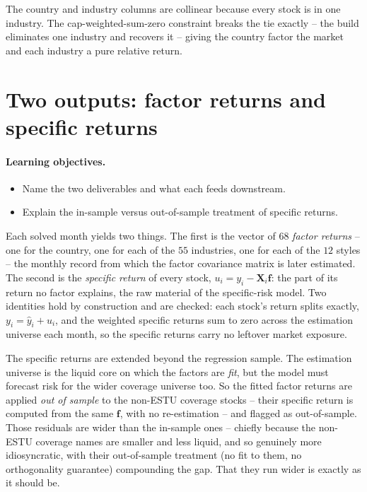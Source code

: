 \documentclass[11pt]{article}
\theoremstyle{definition}
\theoremstyle{plain}
\theoremstyle{remark}
\newcommand{\Xmat}{\mathbf{X}}
\newcommand{\fvec}{\mathbf{f}}
\begin{document}
\begin{keyresult}
The country and industry columns are collinear because every stock is in one industry. The cap-weighted-sum-zero constraint breaks the tie exactly -- the build eliminates one industry and recovers it -- giving the country factor the market and each industry a pure relative return.
\end{keyresult}

\section{Two outputs: factor returns and specific returns}\label{sec:outputs}

\paragraph{Learning objectives.}
\begin{itemize}[leftmargin=1.4em,topsep=2pt]
  \item Name the two deliverables and what each feeds downstream.
  \item Explain the in-sample versus out-of-sample treatment of specific returns.
\end{itemize}

Each solved month yields two things. The first is the vector of $68$ \emph{factor returns} -- one for the country, one for each of the $55$ industries, one for each of the $12$ styles -- the monthly record from which the factor covariance matrix is later estimated. The second is the \emph{specific return} of every stock, $u_i = y_i - \Xmat_i\fvec$: the part of its return no factor explains, the raw material of the specific-risk model. Two identities hold by construction and are checked: each stock's return splits exactly, $y_i = \hat y_i + u_i$, and the weighted specific returns sum to zero across the estimation universe each month, so the specific returns carry no leftover market exposure.

The specific returns are extended beyond the regression sample. The estimation universe is the liquid core on which the factors are \emph{fit}, but the model must forecast risk for the wider coverage universe too. So the fitted factor returns are applied \emph{out of sample} to the non-ESTU coverage stocks -- their specific return is computed from the same $\fvec$, with no re-estimation -- and flagged as out-of-sample. Those residuals are wider than the in-sample ones -- chiefly because the non-ESTU coverage names are smaller and less liquid, and so genuinely more idiosyncratic, with their out-of-sample treatment (no fit to them, no orthogonality guarantee) compounding the gap. That they run wider is exactly as it should be.
\end{document}
